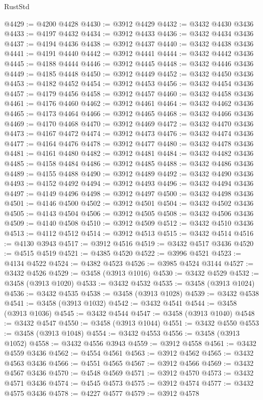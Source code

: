 \begin{lexlean}{RustStd}
\begin{coremodule}
@4429 := @4200 @4428
@4430 := @3912 @4429
@4432 := @3432 @4430 @3436
@4433 := @4197 @4432
@4434 := @3912 @4433
@4436 := @3432 @4434 @3436
@4437 := @4194 @4436
@4438 := @3912 @4437
@4440 := @3432 @4438 @3436
@4441 := @4191 @4440
@4442 := @3912 @4441
@4444 := @3432 @4442 @3436
@4445 := @4188 @4444
@4446 := @3912 @4445
@4448 := @3432 @4446 @3436
@4449 := @4185 @4448
@4450 := @3912 @4449
@4452 := @3432 @4450 @3436
@4453 := @4182 @4452
@4454 := @3912 @4453
@4456 := @3432 @4454 @3436
@4457 := @4179 @4456
@4458 := @3912 @4457
@4460 := @3432 @4458 @3436
@4461 := @4176 @4460
@4462 := @3912 @4461
@4464 := @3432 @4462 @3436
@4465 := @4173 @4464
@4466 := @3912 @4465
@4468 := @3432 @4466 @3436
@4469 := @4170 @4468
@4470 := @3912 @4469
@4472 := @3432 @4470 @3436
@4473 := @4167 @4472
@4474 := @3912 @4473
@4476 := @3432 @4474 @3436
@4477 := @4164 @4476
@4478 := @3912 @4477
@4480 := @3432 @4478 @3436
@4481 := @4161 @4480
@4482 := @3912 @4481
@4484 := @3432 @4482 @3436
@4485 := @4158 @4484
@4486 := @3912 @4485
@4488 := @3432 @4486 @3436
@4489 := @4155 @4488
@4490 := @3912 @4489
@4492 := @3432 @4490 @3436
@4493 := @4152 @4492
@4494 := @3912 @4493
@4496 := @3432 @4494 @3436
@4497 := @4149 @4496
@4498 := @3912 @4497
@4500 := @3432 @4498 @3436
@4501 := @4146 @4500
@4502 := @3912 @4501
@4504 := @3432 @4502 @3436
@4505 := @4143 @4504
@4506 := @3912 @4505
@4508 := @3432 @4506 @3436
@4509 := @4140 @4508
@4510 := @3912 @4509
@4512 := @3432 @4510 @3436
@4513 := @4112 @4512
@4514 := @3912 @4513
@4515 := @3432 @4514
@4516 := @4130 @3943
@4517 := @3912 @4516
@4519 := @3432 @4517 @3436
@4520 := @4515 @4519
@4521 := @4385 @4520
@4522 := @3996 @4521
@4523 := @4134 @4522
@4524 := @4382 @4523
@4526 := @3985 @4524 @3144
@4527 := @3432 @4526
@4529 := @3458 (@3913 @1016)
@4530 := @3432 @4529
@4532 := @3458 (@3913 @1020)
@4533 := @3432 @4532
@4535 := @3458 (@3913 @1024)
@4536 := @3432 @4535
@4538 := @3458 (@3913 @1028)
@4539 := @3432 @4538
@4541 := @3458 (@3913 @1032)
@4542 := @3432 @4541
@4544 := @3458 (@3913 @1036)
@4545 := @3432 @4544
@4547 := @3458 (@3913 @1040)
@4548 := @3432 @4547
@4550 := @3458 (@3913 @1044)
@4551 := @3432 @4550
@4553 := @3458 (@3913 @1048)
@4554 := @3432 @4553
@4556 := @3458 (@3913 @1052)
@4558 := @3432 @4556 @3943
@4559 := @3912 @4558
@4561 := @3432 @4559 @3436
@4562 := @4554 @4561
@4563 := @3912 @4562
@4565 := @3432 @4563 @3436
@4566 := @4551 @4565
@4567 := @3912 @4566
@4569 := @3432 @4567 @3436
@4570 := @4548 @4569
@4571 := @3912 @4570
@4573 := @3432 @4571 @3436
@4574 := @4545 @4573
@4575 := @3912 @4574
@4577 := @3432 @4575 @3436
@4578 := @4227 @4577
@4579 := @3912 @4578

\end{coremodule}
\end{lexlean}
